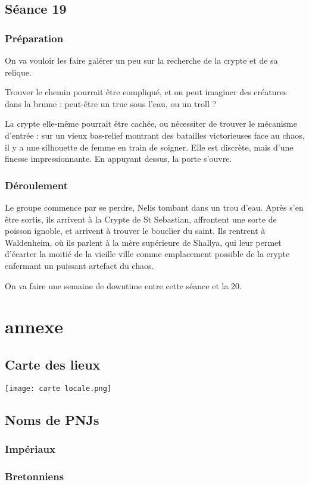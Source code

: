 \documentclass[10pt,a4paper]{book}
\begin{document}
\section{Séance 19}
\subsection{Préparation}
On va vouloir les faire galérer un peu sur la recherche de la crypte et de sa relique.

Trouver le chemin pourrait être compliqué, et on peut imaginer des créatures dans la brume : peut-être un truc sous l'eau, ou un troll ?

La crypte elle-même pourrait être cachée, ou nécessiter de trouver le mécanisme d'entrée : sur un vieux bas-relief montrant des batailles victorieuses face au chaos, il y a une silhouette de femme en train de soigner. Elle est discrète, mais d'une finesse impressionnante. En appuyant dessus, la porte s'ouvre.
\subsection{Déroulement}
Le groupe commence par se perdre, Nelis tombant dans un trou d'eau. Après s'en être sortis, ils arrivent à la Crypte de St Sebastian, affrontent une sorte de poisson ignoble, et arrivent à trouver le bouclier du saint.
Ils rentrent à Waldenheim, où ils parlent à la mère supérieure de Shallya, qui leur permet d'écarter la moitié de la vieille ville comme emplacement possible de la crypte enfermant un puissant artefact du chaos.

On va faire une semaine de downtime entre cette séance et la 20.
\chapter*{annexe}
\section{Carte des lieux}
\texttt{[image: carte locale.png]}
\section*{Noms de PNJs}
\subsection*{Impériaux}
\subsection*{Bretonniens}
\end{document}
